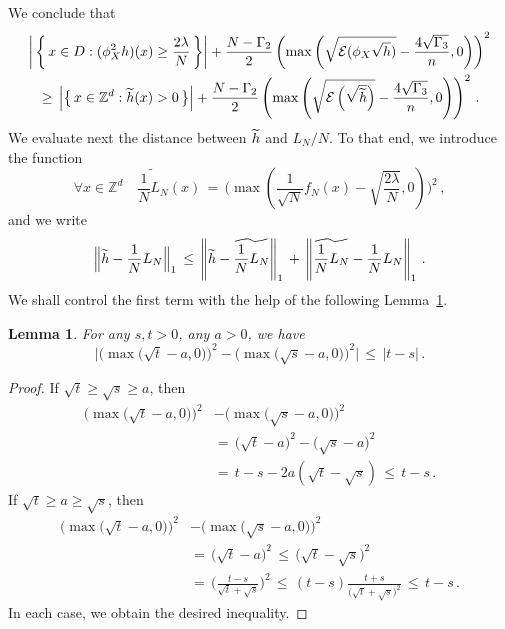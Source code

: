 \documentclass[10pt]{amsart}
\newtheorem{lemm}[theo]{Lemma}\newtheorem{prop}[theo]{Proposition}\newtheorem{coro}[theo]{Corollary}\newtheorem{conj}[theo]{Conjecture}
\theoremstyle{definition}\newtheorem{defi}[theo]{Definition}\newtheorem{rema}[theo]{Remark}\newtheorem{exam}[theo]{Example}\newtheorem{exem}[theo]{Example}\newtheorem{nota}[theo]{Notation}
\newcommand*\Zd {{\mathbb Z^d}}
\newcommand*\wh{{\tilde h}}
\newcommand{\cE}{\mathcal{E}}
\let\oldtilde\tilde
\renewcommand*{\tilde}[1]{\mathchoice{\widetilde{#1}}{\widetilde{#1}}{\oldtilde{#1}}{\oldtilde{#1}}}\let\oldhat\hat
\renewcommand*{\hat}[1]{\mathchoice{\widehat{#1}}{\widehat{#1}}{\oldhat{#1}}{\oldhat{#1}}}\let\oldexists\exists
\renewcommand*{\exists}{\mathrel{\oldexists}}
\let\oldforall\forall
\renewcommand*{\forall}{\mathrel{\oldforall}}
\begin{document}
We conclude that
\begin{multline}\label{qfrt}
\left|\,\left\{\,x\in D: (\phi_X^2h)(x)\geq\frac{2\lambda}{N}
\,\right\}\right|+
\frac{N-\Gamma_2}{2}
\left(\max
\left(\sqrt{\cE(\phi_X\sqrt{h})}-
\frac{4\sqrt{\Gamma_3}}{n},0 \right) \right)^2
\\
\,\geq\,
\Big|\big\{\,x\in\Zd:\wh(x)>0\,\big\}\Big| +\frac{N-\Gamma_2}{2}
\left(\max\left(
\sqrt{\cE\left(\sqrt{\widetilde h}\right)}-
\frac{4\sqrt{\Gamma_3}}{n},0\right) \right)^2 \,.
\end{multline}
We evaluate next the distance between $\wh$ and $L_N/N$. To that end, we introduce the function
\[
\forall x \in\Zd\quad
\widetilde{\frac{1}{N}L_N}(x)\,=\,\Bigg(\max\left({\frac{1}{\sqrt N}f_N}(x)-
\sqrt{\frac{2\lambda}{N}},0\right)\Bigg)^2\,,
\]
and we write
\begin{equation}\label{tgu}
\Big\|\wh-\frac{1}{N}L_N\Big\|_{1}\,\leq\,
\left\|\wh-\widetilde{\frac{1}{N}L_N}\right\|_{1}\,+\,
\left\| {\widetilde {\frac{1}{N}L_N}}-
\frac{1}{N}L_N\right\|_{1}\,.
\end{equation}
We shall control the first term with the help of the following Lemma~\ref{eaxe}.
\begin{lemm}\label{eaxe}
For any $s,t>0$, any $a>0$, we have
\[
\Big|
\Big(\max\big(\sqrt{t}-a,0\big)\Big)^2 -
\Big(\max\big(\sqrt{s}-a,0\big)\Big)^2
\Big|\,\leq\,|t-s|\,.
\]
\end{lemm}
\begin{proof}
If $\sqrt{t}\geq\sqrt{s}\geq a$, then
\begin{align*}
\Big(\max\big(\sqrt{t}-a,0\big)\Big)^2 &-
\Big(\max\big(\sqrt{s}-a,0\big)\Big)^2
\\
&=\,\big(\sqrt{t}-a\big)^2-
\big(\sqrt{s}-a\big)^2\\
&=\,t-s-2a(\sqrt{t}-\sqrt{s})\,\leq\,t-s\,.
\end{align*}
If $\sqrt{t}\geq a\geq\sqrt{s}$, then
\begin{align*}
\Big(\max\big(\sqrt{t}-a,0\big)\Big)^2 &-
\Big(\max\big(\sqrt{s}-a,0\big)\Big)^2
\\
&=\,\big(\sqrt{t}-a\big)^2\,\leq\,
\big(\sqrt{t}-\sqrt{s}\big)^2\\
&=\,\Big(\frac{t-s}{\sqrt{t}+\sqrt{s}}\Big)^2
\,\leq\,(t-s)
\frac{t+s}{\big(\sqrt{t}+\sqrt{s}\big)^2}\,\leq\,t-s\,.
\end{align*}
In each case, we obtain the desired inequality.
\end{proof}
\end{document}
